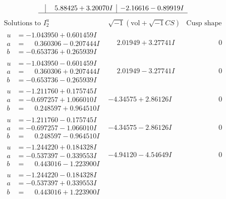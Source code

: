 \documentclass[1p]{elsarticle_modified}
\theoremstyle{definition}
\newcommand{\I}{\sqrt{-1}}
\begin{document}
$$\begin{array}{c|c|c}
 & \phantom{-}5.88425 + 3.20070 I & -2.16616 - 0.89919 I\\
 \hline 
 \end{array}$$\newpage$$\begin{array}{c|c|c}  
\text{Solutions to }I^u_{2}& \I (\text{vol} + \sqrt{-1}CS) & \text{Cusp shape}\\
 \hline 
\begin{aligned}
u &= -1.043950 + 0.601459 I \\
a &= \phantom{-}0.360306 - 0.207444 I \\
b &= -0.653736 + 0.265939 I\end{aligned}
 & \phantom{-}2.01949 + 3.27741 I & \phantom{-0.000000 } 0 \\ \hline\begin{aligned}
u &= -1.043950 - 0.601459 I \\
a &= \phantom{-}0.360306 + 0.207444 I \\
b &= -0.653736 - 0.265939 I\end{aligned}
 & \phantom{-}2.01949 - 3.27741 I & \phantom{-0.000000 } 0 \\ \hline\begin{aligned}
u &= -1.211760 + 0.175745 I \\
a &= -0.697257 + 1.066010 I \\
b &= \phantom{-}0.248597 + 0.964510 I\end{aligned}
 & -4.34575 + 2.86126 I & \phantom{-0.000000 } 0 \\ \hline\begin{aligned}
u &= -1.211760 - 0.175745 I \\
a &= -0.697257 - 1.066010 I \\
b &= \phantom{-}0.248597 - 0.964510 I\end{aligned}
 & -4.34575 - 2.86126 I & \phantom{-0.000000 } 0 \\ \hline\begin{aligned}
u &= -1.244220 + 0.184328 I \\
a &= -0.537397 - 0.339553 I \\
b &= \phantom{-}0.443016 - 1.223900 I\end{aligned}
 & -4.94120 - 4.54649 I & \phantom{-0.000000 } 0 \\ \hline\begin{aligned}
u &= -1.244220 - 0.184328 I \\
a &= -0.537397 + 0.339553 I \\
b &= \phantom{-}0.443016 + 1.223900 I\end{aligned}

\end{array}$$
\end{document}
